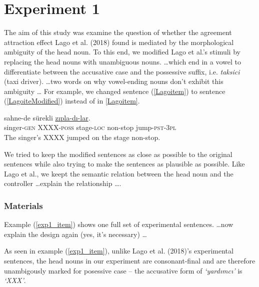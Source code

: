 \documentclass[doc]{apa6}
\begin{document}
\hypertarget{experiment-1}{%
\section{Experiment 1}\label{experiment-1}}

The aim of this study was examine the question of whether the agreement attraction effect Lago et al. (2018) found is mediated by the morphological ambiguity of the head noun.
To this end, we modified Lago et al.'s stimuli by replacing the head nouns with unambiguous nouns.
\ldots which end in a vowel to differentiate between the accusative case and the possessive suffix, i.e. \emph{taksici} (taxi driver).
\ldots two words on why vowel-ending nouns don't exhibit this ambiguity \ldots
For example, we changed sentence (\ref{Lagoitem}) to sentence (\ref{LagoiteModified}) instead of in \autoref{Lagoitem}.

\begin{exe}
\ex \label{LagoiteModified}
 sahne-de sürekli \underline{zıpla-dı-lar}.\\
singer-\textsc{gen} XXXX-\textsc{poss} stage-\textsc{loc} non-stop jump-\textsc{pst}-\textsc{3pl}\\
\glt The singer's XXXX jumped on the stage non-stop.
\end{exe}

We tried to keep the modified sentences as close as possible to the original sentences while also trying to make the sentences as plausible as possible.
Like Lago et al., we keept the semantic relation between the head noun and the controller \ldots explain the relationship \ldots.

\hypertarget{materials}{%
\subsubsection{Materials}\label{materials}}

Example (\ref{exp1_item}) shows one full set of experimental sentences. \ldots now explain the design again (yes, it's necessary) \ldots 

As seen in example (\ref{exp1_item}), unlike Lago et al. (2018)'s experimental sentences, the head nouns in our experiment are consonant-final and are therefore unambigously marked for posessive case -- the accusative form of \emph{`yardımcı'} is \emph{`XXX'}.
\end{document}
